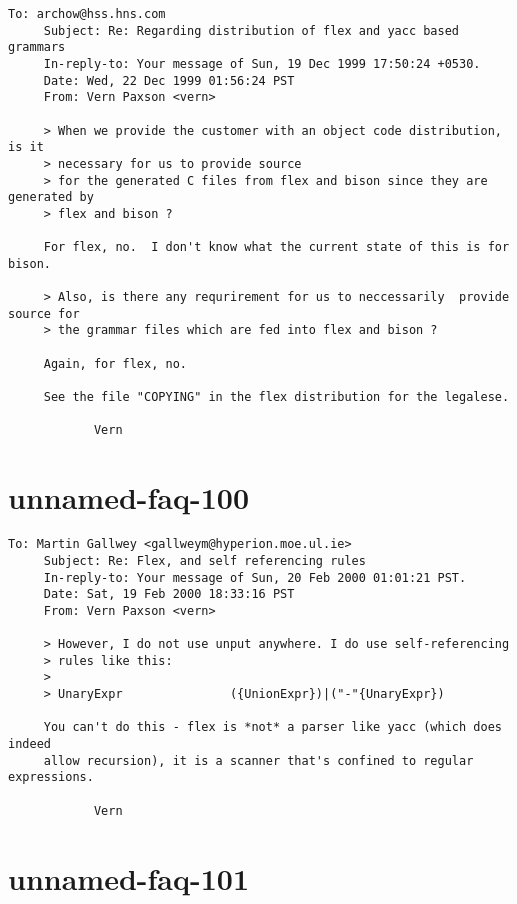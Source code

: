\documentclass[openany,oneside]{book}
\begin{document}
\begin{verbatim}
To: archow@hss.hns.com
     Subject: Re: Regarding distribution of flex and yacc based grammars
     In-reply-to: Your message of Sun, 19 Dec 1999 17:50:24 +0530.
     Date: Wed, 22 Dec 1999 01:56:24 PST
     From: Vern Paxson <vern>
     
     > When we provide the customer with an object code distribution, is it
     > necessary for us to provide source
     > for the generated C files from flex and bison since they are generated by
     > flex and bison ?
     
     For flex, no.  I don't know what the current state of this is for bison.
     
     > Also, is there any requrirement for us to neccessarily  provide source for
     > the grammar files which are fed into flex and bison ?
     
     Again, for flex, no.
     
     See the file "COPYING" in the flex distribution for the legalese.
     
     		Vern
\end{verbatim}

\section{unnamed-faq-100}

\begin{verbatim}
To: Martin Gallwey <gallweym@hyperion.moe.ul.ie>
     Subject: Re: Flex, and self referencing rules
     In-reply-to: Your message of Sun, 20 Feb 2000 01:01:21 PST.
     Date: Sat, 19 Feb 2000 18:33:16 PST
     From: Vern Paxson <vern>
     
     > However, I do not use unput anywhere. I do use self-referencing
     > rules like this:
     >
     > UnaryExpr               ({UnionExpr})|("-"{UnaryExpr})
     
     You can't do this - flex is *not* a parser like yacc (which does indeed
     allow recursion), it is a scanner that's confined to regular expressions.
     
     		Vern
\end{verbatim}

\section{unnamed-faq-101}
\end{document}

